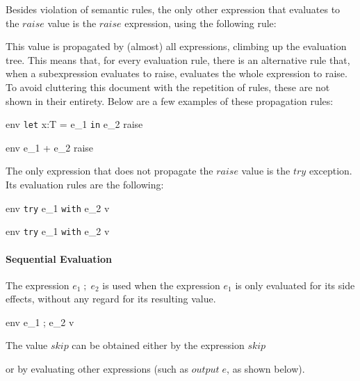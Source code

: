 \documentclass{article}
\begin{document}
Besides violation of semantic rules, the only other expression that evaluates to the $raise$ value is the $raise$ expression, using the following rule:


This value is propagated by (almost) all expressions, climbing up the evaluation tree.
This means that, for every evaluation rule, there is an alternative rule that, when a subexpression evaluates to raise, evaluates the whole expression to raise.
To avoid cluttering this document with the repetition of rules, these are not shown in their entirety.
Below are a few examples of these propagation rules:

    {\mbox{env} \vdash \texttt{let} \; x:T = e_1 \; \texttt{in} \; e_2 \Downarrow raise}

    {\mbox{env} \vdash e_1 + e_2 \Downarrow raise}

The only expression that does not propagate the $raise$ value is the $try$ exception.
Its evaluation rules are the following:

    {\mbox{env} \vdash \texttt{try} \; e_1 \; \texttt{with} \; e_2 \Downarrow v}

    {\mbox{env} \vdash \texttt{try} \; e_1 \; \texttt{with} \; e_2 \Downarrow v}

\paragraph{Sequential Evaluation}
The expression $e_1 \; ; \; e_2$ is used when the expression $e_1$ is only evaluated for its side effects, without any regard for its resulting value.

    {\mbox{env} \vdash e_1 \; ; \; e_2 \Downarrow v}

The value $skip$ can be obtained either by the expression $skip$


or by evaluating other expressions (such as $output \; e$, as shown below).
\end{document}
